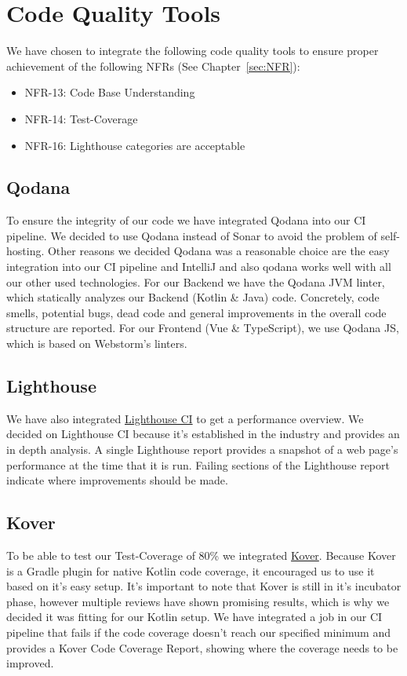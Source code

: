 \section{Code Quality Tools}
We have chosen to integrate the following code quality tools to ensure proper achievement of the following NFRs (See Chapter~\ref{sec:NFR}):
\begin{itemize}
    \item NFR-13: Code Base Understanding
    \item NFR-14: Test-Coverage
    \item NFR-16: Lighthouse categories are acceptable
\end{itemize}

\subsection{Qodana}
To ensure the integrity of our code we have integrated Qodana into our CI pipeline.
We decided to use Qodana instead of Sonar to avoid the problem of self-hosting.
Other reasons we decided Qodana was a reasonable choice are the easy integration into our CI pipeline and IntelliJ and also qodana works well with all our other used technologies.
For our Backend we have the Qodana JVM linter, which statically analyzes our Backend (Kotlin \& Java) code.
Concretely, code smells, potential bugs, dead code and general improvements in the overall code structure are reported.
For our Frontend (Vue \& TypeScript), we use Qodana JS, which is based on Webstorm's linters.

\subsection{Lighthouse}
We have also integrated \href{https://github.com/GoogleChrome/lighthouse-ci}{Lighthouse CI} to get a performance overview.
We decided on Lighthouse CI because it's established in the industry and provides an in depth analysis.
A single Lighthouse report provides a snapshot of a web page's performance at the time that it is run.
Failing sections of the Lighthouse report indicate where improvements should be made.

\subsection{Kover}
To be able to test our Test-Coverage of 80\% we integrated \href{https://github.com/Kotlin/kotlinx-kover}{Kover}.
Because Kover is a Gradle plugin for native Kotlin code coverage, it encouraged us to use it based on it's easy setup.
It's important to note that Kover is still in it's incubator phase, however multiple reviews have shown promising results, which is why we decided it was fitting for our Kotlin setup.
We have integrated a job in our CI pipeline that fails if the code coverage doesn't reach our specified minimum and provides a Kover Code Coverage Report, showing where the coverage needs to be improved.

